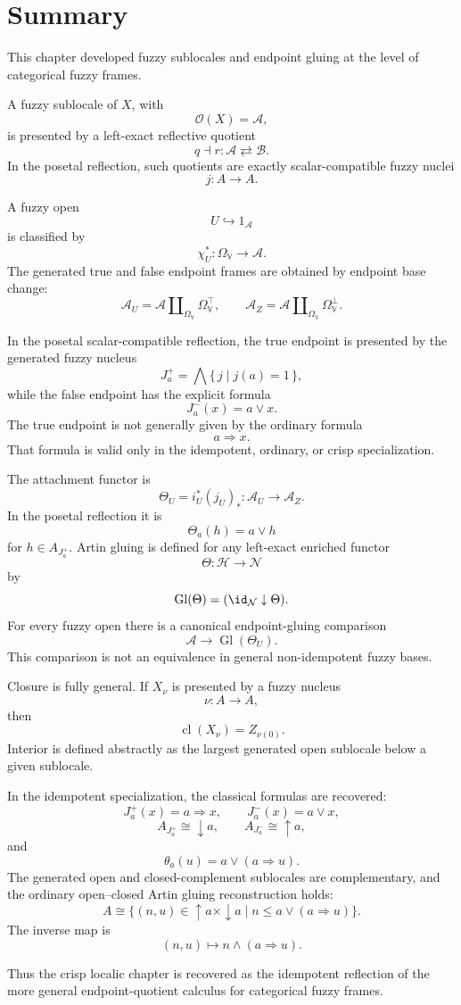 \section{Summary}
\label{sec:summary-fuzzy-sublocales-open-closed-gluing}

This chapter developed fuzzy sublocales and endpoint gluing at the level of
categorical fuzzy frames.

A fuzzy sublocale of \(X\), with
\[
    \mathcal O(X)=\mathcal A,
\]
is presented by a left-exact reflective quotient
\[
    q\dashv r:
    \mathcal A
    \rightleftarrows
    \mathcal B.
\]
In the posetal reflection, such quotients are exactly scalar-compatible fuzzy
nuclei
\[
    j:A\to A.
\]

A fuzzy open
\[
    U\hookrightarrow1_{\mathcal A}
\]
is classified by
\[
    \chi_U^\ast:\Omega_{\mathbb V}\to\mathcal A.
\]
The generated true and false endpoint frames are obtained by endpoint base
change:
\[
    \mathcal A_U
    =
    \mathcal A\amalg_{\Omega_{\mathbb V}}\Omega_{\mathbb V}^{\top},
    \qquad
    \mathcal A_Z
    =
    \mathcal A\amalg_{\Omega_{\mathbb V}}\Omega_{\mathbb V}^{\bot}.
\]

In the posetal scalar-compatible reflection, the true endpoint is presented by
the generated fuzzy nucleus
\[
    J_a^+
    =
    \bigwedge
    \{\,j\mid j(a)=1\,\},
\]
while the false endpoint has the explicit formula
\[
    J_a^-(x)=a\vee x.
\]
The true endpoint is not generally given by the ordinary formula
\[
    a\Rightarrow x.
\]
That formula is valid only in the idempotent, ordinary, or crisp
specialization.

The attachment functor is
\[
    \Theta_U=i_U^\ast(j_U)_\ast:
    \mathcal A_U\to\mathcal A_Z.
\]
In the posetal reflection it is
\[
    \Theta_a(h)=a\vee h
\]
for \(h\in A_{J_a^+}\).  Artin gluing is defined for any left-exact enriched
functor
\[
    \Theta:\mathcal H\to\mathcal N
\]
by
\[
    \operatorname{Gl}(\Theta)
    =
    (\id_{\mathcal N}\downarrow\Theta).
\]
For every fuzzy open there is a canonical endpoint-gluing comparison
\[
    \mathcal A\to\operatorname{Gl}(\Theta_U).
\]
This comparison is not an equivalence in general non-idempotent fuzzy bases.

Closure is fully general.  If \(X_\nu\) is presented by a fuzzy nucleus
\[
    \nu:A\to A,
\]
then
\[
    \operatorname{cl}(X_\nu)=Z_{\nu(0)}.
\]
Interior is defined abstractly as the largest generated open sublocale below a
given sublocale.

In the idempotent specialization, the classical formulas are recovered:
\[
    J_a^+(x)=a\Rightarrow x,
    \qquad
    J_a^-(x)=a\vee x,
\]
\[
    A_{J_a^+}\cong\downarrow a,
    \qquad
    A_{J_a^-}\cong\uparrow a,
\]
and
\[
    \theta_a(u)=a\vee(a\Rightarrow u).
\]
The generated open and closed-complement sublocales are complementary, and the
ordinary open--closed Artin gluing reconstruction holds:
\[
    A\cong
    \{(n,u)\in\uparrow a\times\downarrow a
      \mid
      n\leq a\vee(a\Rightarrow u)\}.
\]
The inverse map is
\[
    (n,u)\longmapsto n\wedge(a\Rightarrow u).
\]

Thus the crisp localic chapter is recovered as the idempotent reflection of
the more general endpoint-quotient calculus for categorical fuzzy frames.